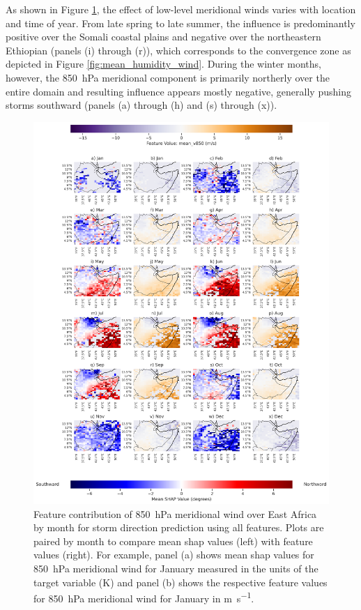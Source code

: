 As shown in Figure \ref{fig:storm_direction_all_shap_mean_v850_map_by_month}, the effect of low-level meridional winds varies with location and time of year. From late spring to late summer, the influence is predominantly positive over the Somali coastal plains and negative over the northeastern Ethiopian (panels (i) through (r)), which corresponds to the convergence zone as depicted in Figure \ref{fig:mean_humidity_wind}. During the winter months, however, the \SI{850}{\hecto\pascal} meridional component is primarily northerly over the entire domain and resulting influence appears mostly negative, generally pushing storms southward (panels (a) through (h) and (s) through (x)).

\begin{figure}[ht]
    \centering
    \includegraphics[width=\textwidth]{../figures/generated/experiments/storm_direction/geographic_corr/storm_direction_all_shap_mean_v850_map_by_month.png}
    \caption{Feature contribution of \SI{850}{\hecto\pascal} meridional wind over East Africa by month for storm direction prediction using all features. Plots are paired by month to compare mean \acrshort{shap} values (left) with feature values (right). For example, panel (a) shows mean \acrshort{shap} values for \SI{850}{\hecto\pascal} meridional wind for January measured in the units of the target variable (\unit{\kelvin}) and panel (b) shows the respective feature values for \SI{850}{\hecto\pascal} meridional wind for January in \unit{\meter\per\second}.}
    \label{fig:storm_direction_all_shap_mean_v850_map_by_month}
\end{figure}

